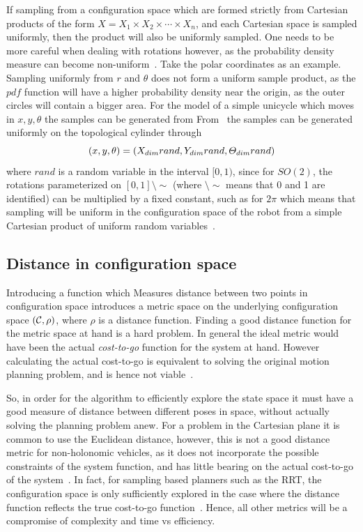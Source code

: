If sampling from a configuration space which are formed strictly from Cartesian
products of the form \(X = X_1\times X_2\times \cdots \times X_n\), and each
Cartesian space is sampled uniformly, then the product will also be uniformly
sampled. One needs to be more careful when dealing with rotations however, as
the probability density measure can become non-uniform~\cite{Lav06}. Take the
polar coordinates as an example. Sampling uniformly from \(r\) and \(\theta\)
does not form a uniform sample product, as the \(pdf\) function will have a
higher probability density near the origin, as the outer circles will contain a
bigger area. For the model of a simple unicycle which moves in \(x,y,\theta\)
the samples can be generated from
From~\cite{kuffnerEffectiveSamplingDistance2004} the samples can be generated
uniformly on the topological cylinder through
\[
  (x,y,\theta) = (\mathnormal{X}_{dim}rand, \mathnormal{Y}_{dim}rand,
  \mathnormal{\Theta}_{dim}rand)
\]
where \(rand\) is a random variable in the interval \([0,1)\), since for
\(SO(2)\), the rotations parameterized on \([0,1]\setminus\sim\) (where
\(\setminus\sim\) means that 0 and 1 are identified) can be multiplied by a
fixed constant, such as for \(2\pi\) which means that sampling will be uniform
in the configuration space of the robot from a simple Cartesian product of
uniform random variables~\cite{Lav06}.

\subsection{Distance in configuration space}

Introducing a function which Measures distance between two points in
configuration space introduces a metric space on the underlying configuration
space \((\mathcal{C}{},\rho)\), where \(\rho\) is a distance
function. Finding a good distance function for the metric space at hand is a
hard problem. In general the ideal metric would have been the actual
\textit{cost-to-go} function for the system at hand. However calculating the
actual cost-to-go is equivalent to solving the original motion planning problem,
and is hence not viable~\cite{pengchengReducingMetricSensitivity2001}.

So, in order for the \rrtfunnel{} algorithm to efficiently explore the state
space it must have a good measure of distance between different poses in space,
without actually solving the planning problem anew. For a problem in the
Cartesian plane it is common to use the Euclidean distance, however, this is not
a good distance metric for non-holonomic vehicles, as it does not incorporate
the possible constraints of the system function, and has little bearing on the
actual cost-to-go of the system~\cite{parkFeedbackMotionPlanning2015}. In fact,
for sampling based planners such as the \ac{RRT}, the configuration space is
only sufficiently explored in the case where the distance function reflects the
true cost-to-go function~\cite{pengchengReducingMetricSensitivity2001}. Hence,
all other metrics will be a compromise of complexity and time vs efficiency.

